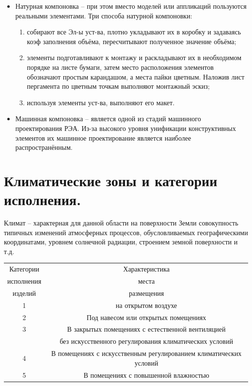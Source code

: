 \documentclass[unicode, 12pt, a4paper, oneside]{article}
\begin{document}
\begin{itemize}
\item Натурная компоновка – при этом вместо моделей или аппликаций пользуются реальными элементами. Три способа натурной компоновки:
\begin{enumerate}
\item собирают все Эл-ы уст-ва, плотно укладывают их в коробку и задаваясь коэф заполнения объёма, пересчитывают полученное значение объёма;
\item элементы подготавливают к монтажу и раскладывают их в необходимом порядке на листе бумаги, затем место расположения элементов обозначают простым карандашом, а места пайки цветным. Наложив лист пергамента по цветным точкам выполняют монтажный эскиз;
\item используя элементы уст-ва, выполняют его макет.
\end{enumerate}
\item Машинная компоновка – является одной из стадий машинного проектирования РЭА. Из-за высокого уровня унификации конструктивных элементов их машинное проектирование является наиболее распространённым.
\end{itemize}

\section{Климатические зоны и категории исполнения.}

Климат – характерная для данной области на поверхности Земли совокупность типичных изменений атмосферных процессов, обусловливаемых географическими координатами, уровнем солнечной радиации, строением земной поверхности и т.д.
\begin{center}
\begin{tabular}{|c|c|}
\hline Категории& Характеристика\\исполнения & места \\  изделий & размещения\\
\hline 1 & на открытом воздухе \\ 
\hline 2 & Под навесом или открытых помещениях \\
\hline 3 & В закрытых помещениях с естественной вентиляцией\\ & без искусственного регулирования климатических условий \\
\hline 4 & В помещениях с искусственным регулированием климатических условий\\
\hline 5 & В помещениях с повышенной влажностью \\
\hline
\end{tabular}
\end{center}
\end{document}
